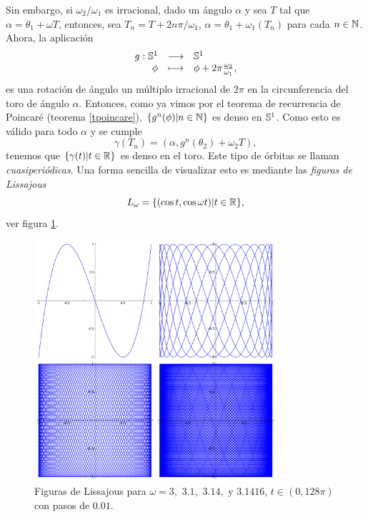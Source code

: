   Sin embargo, si $\omega_2/\omega_1$ es irracional, dado un ángulo $\alpha$ y sea $T$ tal que $\alpha=\theta_1+\omega T$, entonces, sea $T_n=T+2n\pi/\omega_1$, $\alpha=\theta_1+\omega_1(T_n)$ para cada $n\in \mathbb{N}$. Ahora, la aplicación
  \begin{equation*}
    \begin{array}{rcl}
    g:\mathbb{S}^1 & \longrightarrow &\mathbb{S}^1 \\
  \phi & \longmapsto & \phi + 2\pi\frac{\omega_2}{\omega_1},
  \end{array}
\end{equation*}
es una rotación de ángulo un múltiplo irracional de $2\pi$ en la circunferencia del toro de ángulo $\alpha$. Entonces, como ya vimos por el teorema de recurrencia de Poincaré (teorema \ref{tpoincare}), $\{g^n(\phi)|n\in \mathbb{N}\}$ es denso en $\mathbb{S}^1$. Como esto es válido para todo $\alpha$ y se cumple 
\begin{equation*}
  \gamma(T_n)=(\alpha,g^n(\theta_2)+\omega_2 T),
\end{equation*}
tenemos que $\{\gamma(t)|t \in \mathbb{R} \}$ es denso en el toro. Este tipo de órbitas se llaman \emph{cuasiperiódicas}. Una forma sencilla de visualizar esto es mediante las \emph{figuras de Lissajous} 
\begin{equation*}
  L_{\omega}=\{(\cos t, \cos \omega t) | t \in \mathbb{R}\},
\end{equation*}
ver figura \ref{fig:lissajous}.
\begin{figure}[h!]
  \centering
  \includegraphics[width=0.8\textwidth]{pics/lissajous}
  \caption{\small Figuras de Lissajous para $\omega=3,$ $3.1,$ $3.14,$  y $3.1416$, $t \in (0,128\pi)$ con pasos de $0.01$.}
  \label{fig:lissajous}
\end{figure}

